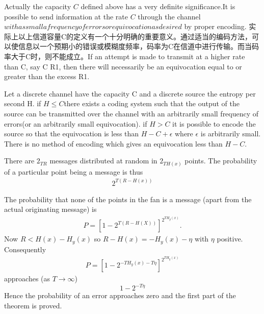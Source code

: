 \documentclass[conference]{IEEEtran}
\begin{document}
Actually the capacity $C$ defined above has a very definite significance.It is possible to send information at the rate $C$ through the channel $with as small a frequency of errors or equivocation as desired$ by proper encoding. 实际上以上信道容量C的定义有一个十分明确的重要意义。通过适当的编码方法，可以使信息以一个预期小的错误或模糊度频率，码率为C在信道中进行传输。而当码率大于C时，则不能成立。If an attempt is made to transmit at a higher rate than C, say C R1, then there will necessarily be an equivocation equal to or greater than the excess R1.

\begin{theorem}
	Let a discrete channel have the capacity C and a discrete source the entropy per second H. if $H \leq C $there exists a coding system such that the output of the source can be transmitted over the channel with an arbitrarily small frequency of errors(or an arbitrarily small equivocation). if $H>C$ it is possible to encode the source so that the equivocation is less than $H-C+\epsilon$ where $\epsilon$ is arbitrarily small. There is no method of encoding which gives an equivocation less than $H-C$.
\end{theorem}
There are $2_{TR}$ messages distributed at random in $2_{TH(x)}$ points. The probability of a particular point being a message is thus
\begin{align*}
2^{T(R-H(x))}
\end{align*}

The probability that none of the points in the fan is a message (apart from the actual originating message) is
\begin{align*}
P=[1-2^{T(R-H(X))}]^{2^{TH_y(x)}}.
\end{align*}
Now $R<H(x)-H_y(x)$ so $R-H(x)=-H_y(x)-\eta$ with $\eta$ positive. Consequently
\begin{align*}
P=[1-2^{-TH_y(x)-T \eta }]^{2^{TH_y(x)}}
\end{align*}
approaches (as $T \longrightarrow \infty $)
\[
1-2^{-T\eta}
\] 
Hence the probability of an error approaches zero and the first part of the theorem is proved.
\end{document}
